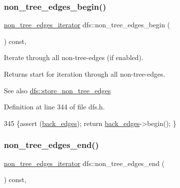 \subsubsection{\texorpdfstring{non\+\_\+tree\+\_\+edges\+\_\+begin()}{non\_tree\_edges\_begin()}}
{\footnotesize\ttfamily \mbox{\hyperlink{classdfs_a95e353f354d3b31daded0c4fe749171a}{non\+\_\+tree\+\_\+edges\+\_\+iterator}} dfs\+::non\+\_\+tree\+\_\+edges\+\_\+begin (\begin{DoxyParamCaption}{ }\end{DoxyParamCaption}) const\hspace{0.3cm}{\ttfamily [inline]}, {\ttfamily [inherited]}}



Iterate through all non-\/tree-\/edges (if enabled). 

\begin{DoxyReturn}{Returns}
start for iteration through all non-\/tree-\/edges. 
\end{DoxyReturn}
\begin{DoxySeeAlso}{See also}
\mbox{\hyperlink{classdfs_a6f54f1c4339eacc8961e795439d4593d}{dfs\+::store\+\_\+non\+\_\+tree\+\_\+edges}} 
\end{DoxySeeAlso}


Definition at line 344 of file dfs.\+h.


\begin{DoxyCode}
345     \{assert (\mbox{\hyperlink{classdfs_a1dc18a7df8d6b238d5301c92fc7540fa}{back\_edges}});  \textcolor{keywordflow}{return} \mbox{\hyperlink{classdfs_a1dc18a7df8d6b238d5301c92fc7540fa}{back\_edges}}->begin(); \}
\end{DoxyCode}
\mbox{\label{classdfs_ad9cd92a18bda23edca8ab3ac60a15ef4}} 
\subsubsection{\texorpdfstring{non\+\_\+tree\+\_\+edges\+\_\+end()}{non\_tree\_edges\_end()}}
{\footnotesize\ttfamily \mbox{\hyperlink{classdfs_a95e353f354d3b31daded0c4fe749171a}{non\+\_\+tree\+\_\+edges\+\_\+iterator}} dfs\+::non\+\_\+tree\+\_\+edges\+\_\+end (\begin{DoxyParamCaption}{ }\end{DoxyParamCaption}) const\hspace{0.3cm}{\ttfamily [inline]}, {\ttfamily [inherited]}}




